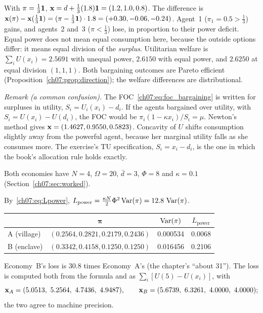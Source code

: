 \documentclass[../solutions_manual.tex]{subfiles}
\begin{document}
 With $\pi = \frac13\mathbf{1}$, $\mathbf{x} = d + \frac13(1.8)\mathbf{1} = (1.2, 1.0, 0.8)$. The difference is $\mathbf{x}(\pi) - \mathbf{x}(\tfrac13\mathbf{1}) = (\pi - \frac13\mathbf{1})\cdot 1.8 = (+0.30, -0.06, -0.24)$. Agent~1 ($\pi_1 = 0.5 > \frac13$) gains, and agents~2 and~3 ($\pi < \frac13$) lose, in proportion to their power deficit. Equal power does not mean equal consumption here, because the outside options differ: it means equal division of the \emph{surplus}. Utilitarian welfare is $\sum_iU(x_i) = 2.5691$ with unequal power, $2.6150$ with equal power, and $2.6250$ at equal division $(1,1,1)$. Both bargaining outcomes are Pareto efficient (Proposition~\ref{ch07:prop:direction}); the welfare differences are distributional.

\emph{Remark (a common confusion).} The FOC~\eqref{ch07:eq:foc_bargaining} is written for surpluses in utility, $S_i = U_i(x_i) - d_i$. If the agents bargained over utility, with $S_i = U(x_i) - U(d_i)$, the FOC would be $\pi_i(1 - \kappa x_i)/S_i = \mu$. Newton's method gives $\mathbf{x} = (1.4627, 0.9550, 0.5823)$. Concavity of $U$ shifts consumption slightly away from the powerful agent, because her marginal utility falls as she consumes more. The exercise's TU specification, $S_i = x_i - d_i$, is the one in which the book's allocation rule holds exactly.


Both economies have $N = 4$, $\Omega = 20$, $\bar d = 3$, $\Phi = 8$ and $\kappa = 0.1$ (Section~\ref{ch07:sec:worked}).

 By~\eqref{ch07:eq:Lpower}, $L_{\text{power}} = \frac{\kappa N}{2}\Phi^2\operatorname{Var}(\pi) = 12.8\,\operatorname{Var}(\pi)$.
\begin{center}
\begin{tabular}{lccc}
\toprule
& $\boldsymbol{\pi}$ & $\operatorname{Var}(\pi)$ & $L_{\text{power}}$ \\
\midrule
A (village) & $(0.2564, 0.2821, 0.2179, 0.2436)$ & 0.000534 & 0.0068 \\
B (enclave) & $(0.3342, 0.4158, 0.1250, 0.1250)$ & 0.016456 & 0.2106 \\
\bottomrule
\end{tabular}
\end{center}
Economy~B's loss is $30.8$ times Economy~A's (the chapter's ``about 31''). The loss is computed both from the formula and as $\sum_i[U(5) - U(x_i)]$, with
\[
\x_A = (5.0513,\ 5.2564,\ 4.7436,\ 4.9487), \qquad \x_B = (5.6739,\ 6.3261,\ 4.0000,\ 4.0000);
\]
the two agree to machine precision.
\end{document}
